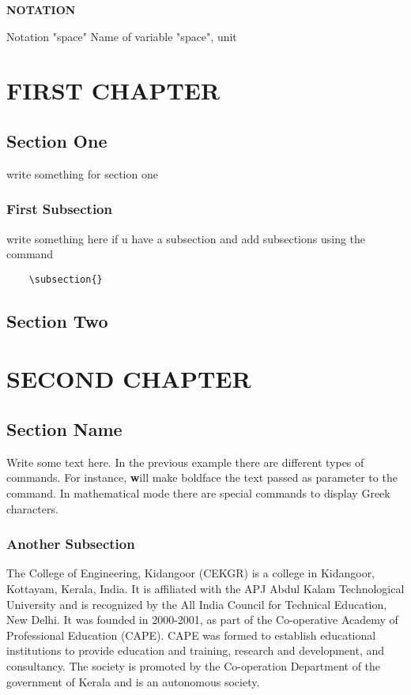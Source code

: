 \documentclass[12pt,a4paper]{report}
\begin{document}
\vspace{2cm}
\begin{center}
  \textbf{NOTATION} 
  \end{center}
Notation "space" Name of variable "space", unit\newline

\thispagestyle{empty}



    

\chapter{FIRST CHAPTER}
\section{Section One}
write something for section one
\subsection{First Subsection}
write something here if u have a subsection and add subsections using the command \begin{verbatim}
    \subsection{}
\end{verbatim} 
\section{Section Two}

\chapter{SECOND CHAPTER}
\section{Section Name}
Write some text here. In the previous example there are different types of commands. For instance, \textbf will make boldface the text passed as parameter to the command. In mathematical mode there are special commands to display Greek characters. 

\subsection{Another Subsection}
The College of Engineering, Kidangoor (CEKGR) is a college in Kidangoor, Kottayam, Kerala, India. It is affiliated with the APJ Abdul Kalam Technological University and is recognized by the All India Council for Technical Education, New Delhi. It was founded in 2000-2001, as part of the Co-operative Academy of Professional Education (CAPE). CAPE was formed to establish educational institutions to provide education and training, research and development, and consultancy. The society is promoted by the Co-operation Department of the government of Kerala and is an autonomous society.
\end{document}
